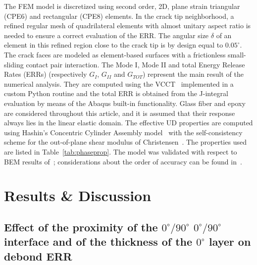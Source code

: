 \documentclass[review]{elsarticle}
\begin{document}
The FEM model is discretized using second order, 2D, plane strain triangular (CPE6) and rectangular (CPE8) elements. In the crack tip neighborhood, a refined regular mesh of quadrilateral elements with almost unitary aspect ratio is needed to ensure a correct evaluation of the ERR. The angular size $\delta$ of an element in this refined region close to the crack tip is by design equal to $0.05^{\circ}$. The crack faces are modeled as element-based surfaces with a frictionless small-sliding contact pair interaction. The Mode I, Mode II and total Energy Release Rates (ERRs) (respectively $G_{I}$, $G_{II}$ and $G_{TOT}$) represent the main result of the numerical analysis. They are computed using the VCCT~\cite{Krueger2004} implemented in a custom Python routine and the total ERR is obtained from the J-integral~\cite{Rice1968} evaluation by means of the Abaqus built-in functionality. Glass fiber and epoxy are considered throughout this article, and it is assumed that their response always lies in the linear elastic domain. The effective UD properties are computed using Hashin's Concentric Cylinder Assembly model~\cite{Hashin1983} with the self-consistency scheme for the out-of-plane shear modulus of Christensen~\cite{Christensen1979}. The properties used are listed in Table~\ref{tab:phaseprop}. The model was validated with respect to BEM results of~\cite{Paris2007,Sandino2016}; considerations about the order of accuracy can be found in~\cite{DiStasio2019}.


\section{Results \& Discussion}

\subsection{Effect of the proximity of the $0^{\circ}/90^{\circ}$ $0^{\circ}/90^{\circ}$ interface and of the thickness of the $0^{\circ}$ layer on debond ERR}\label{subsec:thickness}
\end{document}

